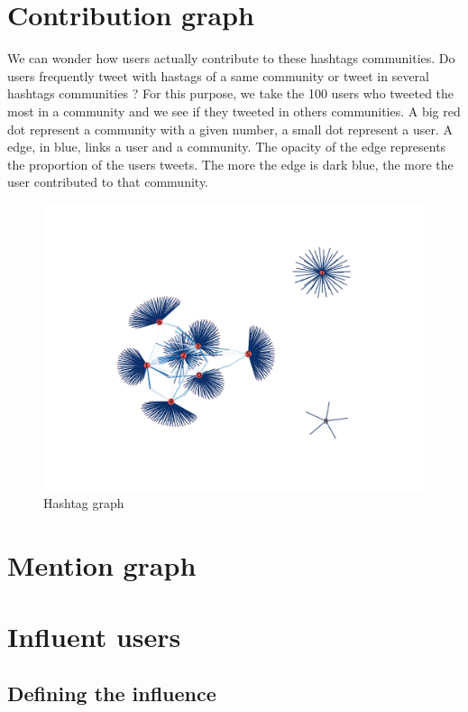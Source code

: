 \documentclass[a4paper,12pt]{report}
\begin{document}
\newpage
\section{Contribution graph}

We can wonder how users actually contribute to these hashtags communities. Do users frequently tweet with hastags of a same community or tweet in several hashtags communities ? For this purpose, we take the 100 users who tweeted the most in a community and we see if they tweeted in others communities. A big red dot represent a community with a given number, a small dot represent a user. A edge, in blue, links a user and a community. The opacity of the edge represents the proportion of the users tweets. The more the edge is dark blue, the more the user contributed to that community. 

\begin{figure}[H]
\centering
\includegraphics[width=\textwidth]{images/graphs/users/13_08.png}
\caption{Hashtag graph}
\end{figure}

\newpage

\section{Mention graph}

\newpage
\section{Influent users}
\subsection{Defining the influence}
\end{document}
